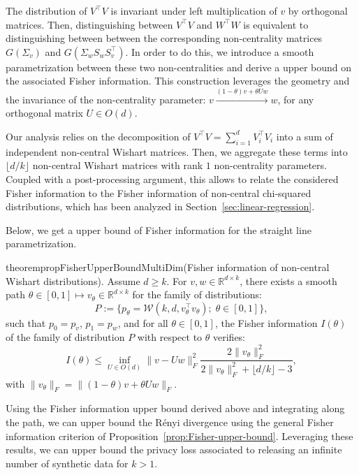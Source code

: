 \documentclass{article}
\theoremstyle{plain}
\theoremstyle{definition}
\theoremstyle{remark}
\begin{document}
The distribution of $V^\top V$ is invariant under left multiplication of $v$ by orthogonal matrices. %
Then, distinguishing between $V^\top V$ and $W^\top W$ is equivalent to distinguishing between between the corresponding non-centrality matrices $G(\Sigma_v)$ and $G(\Sigma_w S_w S_v^\top)$. In order to do this, we introduce a smooth parametrization between these two non-centralities and derive a upper bound on the associated Fisher information. This construction leverages the geometry  and the invariance of the non-centrality parameter:
$v \overset{(1-\theta) v + \theta U w}{\longrightarrow} w$, for any orthogonal matrix $U \in O(d)$.

Our analysis relies on the decomposition of $V^\top V = \sum_{i=1}^d V_i^\top V_i$ into a sum of independent non-central Wishart matrices. Then, we aggregate these terms into $\lfloor d/k \rfloor$ non-central Wishart matrices with rank $1$ non-centrality parameters. Coupled with a post-processing argument, this allows to relate the considered Fisher information to the Fisher information of non-central chi-squared distributions, which has been analyzed in Section~\ref{sec:linear-regression}.

Below, we get a upper bound of Fisher information for the straight line parametrization.


\begin{restatable}{theorem}{propFisherUpperBoundMultiDim}\normalfont (Fisher information of non-central Wishart distributions).
\label{prop:fisher-upper-bound-multi-dim}
Assume $d \geq k$. For $v,w \in \mathbb{R}^{d \times k}$, there exists a smooth path $\theta \in [0,1] \mapsto v_\theta \in \mathbb{R}^{d \times k}$ for the family of distributions: \[P := \{p_{\theta} = \mathcal{W}(k,d,v_\theta^\top v_\theta); \; \theta \in [0,1]\},\] such that $p_{0} = p_v$, $p_{1} = p_w$, and for all $\theta \in [0,1]$, the Fisher information $I(\theta)$ of the family of distribution $P$ with respect to  $\theta$ verifies: 
    \[I(\theta) \leq \inf_{U\in O(d)}\|v - U w\|_F^2  \frac{2\|v_\theta\|_F^2}{2\|v_\theta\|_F^2+ \lfloor d/k \rfloor - 3},\]
    with $\|v_\theta\|_F = \|(1-\theta) v + \theta Uw\|_F$.
\end{restatable}  

Using the Fisher information upper bound derived above and integrating along the path, we can upper bound the Rényi divergence using the general Fisher information criterion of Proposition~\ref{prop:Fisher-upper-bound}. Leveraging these results, we can upper bound the privacy loss associated to releasing an infinite number of synthetic data for $k>1$.
\end{document}
